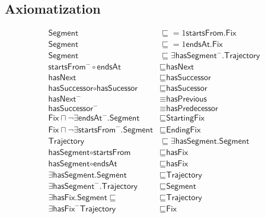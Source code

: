 \subsection{Axiomatization}
\label{axs:Trajectory}
\begin{align}
\textsf{Segment} &\sqsubseteq \mathord{=1}\textsf{startsFrom.Fix}\\
\textsf{Segment} &\sqsubseteq \mathord{=1}\textsf{endsAt.Fix} \\
\textsf{Segment} &\sqsubseteq \exists \textsf{hasSegment}^-\textsf{.Trajectory} \\
\textsf{startsFrom}^- \circ \textsf{endsAt} &\sqsubseteq \textsf{hasNext} \\
\textsf{hasNext} &\sqsubseteq \textsf{hasSuccessor} \\
\textsf{hasSuccessor} \circ \textsf{hasSucessor} &\sqsubseteq \textsf{hasSucessor} \\
\textsf{hasNext}^- &\equiv \textsf{hasPrevious} \\
\textsf{hasSuccessor}^- &\equiv \textsf{hasPredecessor} \\
\textsf{Fix} \sqcap \lnot\exists\textsf{endsAt}^-\textsf{.Segment} &\sqsubseteq \textsf{StartingFix} \\
\textsf{Fix} \sqcap \lnot\exists\textsf{startsFrom}^-\textsf{.Segment} &\sqsubseteq \textsf{EndingFix} \\
\textsf{Trajectory} &\sqsubseteq \exists\textsf{hasSegment.Segment} \\
\textsf{hasSegment} \circ \textsf{startsFrom} &\sqsubseteq \textsf{hasFix} \\
\textsf{hasSegment} \circ \textsf{endsAt} &\sqsubseteq \textsf{hasFix} \\
\exists \textsf{hasSegment.Segment} &\sqsubseteq \textsf{Trajectory} \\
\exists \textsf{hasSegment}^-\textsf{.Trajectory} &\sqsubseteq \textsf{Segment} \\
\exists \textsf{hasFix.Segment} \sqsubseteq &\sqsubseteq \textsf{Trajectory} \\
\exists \textsf{hasFix}^-\textsf{Trajectory} &\sqsubseteq \textsf{Fix}
\end{align}

